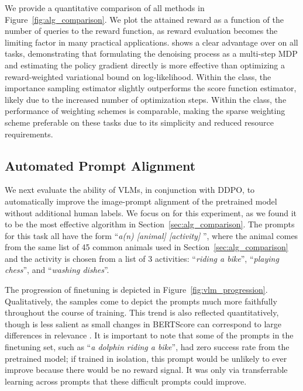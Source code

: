 We provide a quantitative comparison of all methods in Figure~\ref{fig:alg_comparison}.
We plot the attained reward as a function of the number of queries to the reward function, as reward evaluation becomes the limiting factor in many practical applications.
\methodours{} shows a clear advantage over \methodrwr{} on all tasks, demonstrating that formulating the denoising process as a multi-step MDP and estimating the policy gradient directly is more effective than optimizing a reward-weighted variational bound on log-likelihood. Within the \methodours{} class, the importance sampling estimator slightly outperforms the score function estimator, likely due to the increased number of optimization steps. Within the \methodrwr{} class, the performance of weighting schemes is comparable, making the sparse weighting scheme preferable on these tasks due to its simplicity and reduced resource requirements.








\vspace{-5pt}
\subsection{Automated Prompt Alignment}
We next evaluate the ability of VLMs, in conjunction with DDPO, to automatically improve the image-prompt alignment of the pretrained model without additional human labels.
We focus on \methodppo{} for this experiment, as we found it to be the most effective algorithm in Section~\ref{sec:alg_comparison}.
The prompts for this task all have the form ``\emph{a(n) [animal] [activity] }'', where the animal comes from the same list of 45 common animals used in Section~\ref{sec:alg_comparison} and the activity is chosen from a list of 3 activities: ``\emph{riding a bike}'', ``\emph{playing chess}'', and ``\emph{washing dishes}''. 

The progression of finetuning is depicted in Figure~\ref{fig:vlm_progression}.
Qualitatively, the samples come to depict the prompts much more faithfully throughout the course of training.
This trend is also reflected quantitatively, though is less salient as small changes in BERTScore can correspond to large differences in relevance \citep{zhang2020bertscore}.
It is important to note that some of the prompts in the finetuning set, such as ``\emph{a dolphin riding a bike}'', had zero success rate from the pretrained model;
if trained in isolation, this prompt would be unlikely to ever improve because there would be no reward signal.
It was only via transferrable learning across prompts that these difficult prompts could improve.

